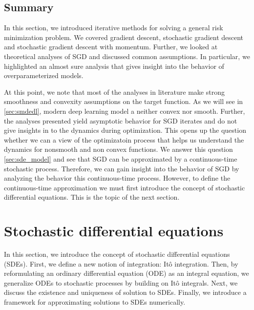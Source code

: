 \documentclass[12pt]{article}
\theoremstyle{definition}
\numberwithin{equation}{section}
\begin{document}

\subsection{Summary}
In this section, we introduced iterative methods for solving a general risk minimization problem. We covered gradient descent, stochastic gradient descent and stochastic gradient descent with momentum. Further, we looked at theoretical analyses of SGD and discussed common assumptions. In particular, we highlighted an almost sure analysis that gives insight into the behavior of overparameterized models. 

At this point, we note that most of the analyses in literature make strong smoothness and convexity assumptions on the target function. As we will see in \autoref{sec:smdedl}, modern deep learning model a neither convex nor smooth. Further, the analyses presented yield asymptotic behavior for SGD iterates and do not give insights in to the dynamics during optimization. This opens up the question whether we can a view of the optimizatoin process that helps us understand the dynamics for nonsmooth and non convex functions.  
 We answer this question \autoref{sec:sde_model} and see that SGD can be approximated by a continuous-time stochastic process. Therefore, we can gain insight into the behavior of SGD by analyzing the behavior this continuous-time process. However, to define the continuous-time approximation we must first introduce the concept of stochastic differential equations. This is the topic of the next section.
\section{Stochastic differential equations}
\label{sec:BackgroundSDETheory}
In this section, we introduce the concept of stochastic differential equations (SDEs). First, we define a new notion of integration: Itô integration. Then, by reformulating an ordinary differential equation (ODE) as an integral equation, we generalize ODEs to stochastic processes by building on Itô integrals. Next, we discuss the existence and uniqueness of solution to SDEs. Finally, we introduce a framework for approximating solutions to SDEs numerically.
\end{document}
